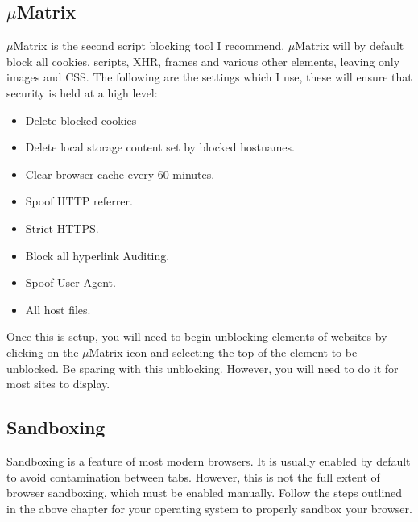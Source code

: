 \documentclass[a4paper,11pt]{report}
\begin{document}
		\subsection{$\mu{}$Matrix}
			$\mu$Matrix is the second script blocking tool I recommend. 
			$\mu{}$Matrix will by default block all cookies, scripts, XHR, frames and various other elements, leaving only images and CSS. 
			The following are the settings which I use, these will ensure that security is held at a high level:
			\begin{itemize}
				\item Delete blocked cookies
				\item Delete local storage content set by blocked hostnames. 
				\item Clear browser cache every 60 minutes. 
				\item Spoof HTTP referrer. 
				\item Strict HTTPS.
				\item Block all hyperlink Auditing. 
				\item Spoof User-Agent. 
				\item All host files. 
			\end{itemize}
			Once this is setup, you will need to begin unblocking elements of websites by clicking on the $\mu{}$Matrix icon and selecting the top of the element to be unblocked. 
			Be sparing with this unblocking. However, you will need to do it for most sites to display. 
		\subsection{Sandboxing}
			Sandboxing is a feature of most modern browsers. It is usually enabled by default to avoid contamination between tabs. 
			However, this is not the full extent of browser sandboxing, which must be enabled manually. 
			Follow the steps outlined in the above chapter for your operating system to properly sandbox your browser. 
\end{document}
